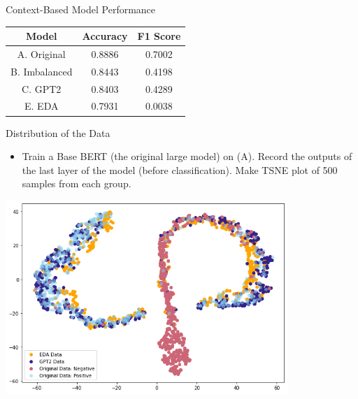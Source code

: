 \documentclass{beamer}
\begin{document}
\begin{frame}{Context-Based Model Performance}

\begin{center}
\begin{tabular}{||c c c||} 
 \hline
 Model & Accuracy & F1 Score \\ [0.5ex] 
 \hline\hline
 A. Original & 0.8886 & 0.7002  \\ 
 \hline
 B. Imbalanced & 0.8443 & 0.4198 \\
 \hline
 C. GPT2 & 0.8403 &  0.4289 \\
 \hline
 E. EDA &  0.7931 & 0.0038 \\
 [1ex] 
 \hline
\end{tabular}
\end{center}

\end{frame}

\begin{frame}{Distribution of the Data}
\begin{itemize}
    \item Train a Base BERT (the original large model) on (A). Record the outputs of the last layer of the model (before classification). Make TSNE plot of 500 samples from each group.
\end{itemize}

\begin{center}
\includegraphics[width=0.8\textwidth]{tsne.png}
\end{center}
\end{frame}
\end{document}
